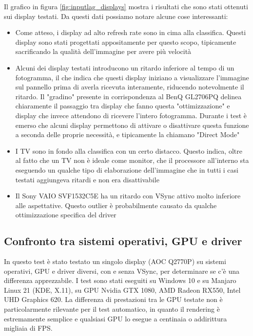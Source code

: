 Il grafico in figura \ref{fig:inputlag_displays} mostra i risultati che sono stati ottenuti sui display testati. Da questi dati possiamo notare alcune cose interessanti:\begin{itemize}
	\item Come atteso, i display ad alto refresh rate sono in cima alla classifica. Questi display sono stati progettati appositamente per questo scopo, tipicamente sacrificando la qualità dell'immagine per avere più velocità
	\item Alcuni dei display testati introducono un ritardo inferiore al tempo di un fotogramma, il che indica che questi display iniziano a visualizzare l'immagine sul pannello prima di averla ricevuta interamente, riducendo notevolmente il ritardo. Il "gradino" presente in corrispondenza al BenQ GL2706PQ delinea chiaramente il passaggio tra display che fanno questa "ottimizzazione" e display che invece attendono di ricevere l'intero fotogramma. Durante i test è emerso che alcuni display permettono di attivare o disattivare questa funzione a seconda delle proprie necessità, e tipicamente la chiamano "Direct Mode"
	\item I TV sono in fondo alla classifica con un certo distacco. Questo indica, oltre al fatto che un TV non è ideale come monitor, che il processore all'interno sta eseguendo un qualche tipo di elaborazione dell'immagine che in tutti i casi testati aggiungeva ritardi e non era disattivabile
	\item Il Sony VAIO SVF1532C5E ha un ritardo con VSync attivo molto inferiore alle aspettative. Questo outlier è probabilmente causato da qualche ottimizzazione specifica del driver
\end{itemize}

\subsection{Confronto tra sistemi operativi, GPU e driver}
In questo test è stato testato un singolo display (AOC Q2770P) su sistemi operativi, GPU e driver diversi, con e senza VSync, per determinare se c'è una differenza apprezzabile. I test sono stati eseguiti su Windows 10 e su Manjaro Linux 21 (KDE, X.11), su GPU Nvidia GTX 1080, AMD Radeon RX550, Intel UHD Graphics 620. La differenza di prestazioni tra le GPU testate non è particolarmente rilevante per il test automatico, in quanto il rendering è estremamente semplice e qualsiasi GPU lo esegue a centinaia o addirittura migliaia di FPS.

